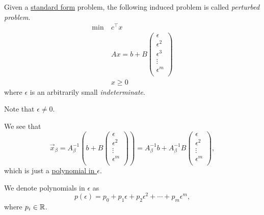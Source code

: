 \begin{definition}\label{def:perturbed-problem}
	Given a \hyperref[def:standard-form]{standard form} problem, the following induced problem is called \emph{perturbed problem}.
	\[
		\begin{aligned}
			\min~ & c^{\top} x               \\
			      & Ax = b + B\begin{pmatrix}
				                  \epsilon   \\
				                  \epsilon^2 \\
				                  \epsilon^3 \\
				                  \vdots     \\
				                  \epsilon^m \\
			                  \end{pmatrix} \\
			      & x\geq 0
		\end{aligned}
	\]
	where \(\epsilon \) is an arbitrarily small \emph{indeterminate}.
\end{definition}

\begin{remark}
	Note that \(\epsilon \neq 0\).
\end{remark}

\begin{note}
	We see that
	\[
		\vec{x}_{\beta} = A^{-1}_{\beta}\left(b + B\begin{pmatrix}
				\epsilon   \\
				\epsilon^2 \\
				\vdots     \\
				\epsilon^m \\
			\end{pmatrix}\right) = A^{-1}_{\beta}b + A^{-1}_{\beta}B\begin{pmatrix}
			\epsilon   \\
			\epsilon^2 \\
			\vdots     \\
			\epsilon^m \\
		\end{pmatrix},
	\]
	which is just a \hyperref[def:polynomial-in-epsilon]{polynomial in \(\epsilon\)}.
\end{note}

\begin{definition}\label{def:polynomial-in-epsilon}
	We denote polynomials in \(\epsilon\) as
	\[
		p(\epsilon) = p_0 + p_1\epsilon + p_2 \epsilon^2 + \cdots + p_{m}\epsilon^m,
	\]
	where \(p_i\in\mathbb{\MakeUppercase{r}}\).
\end{definition}

